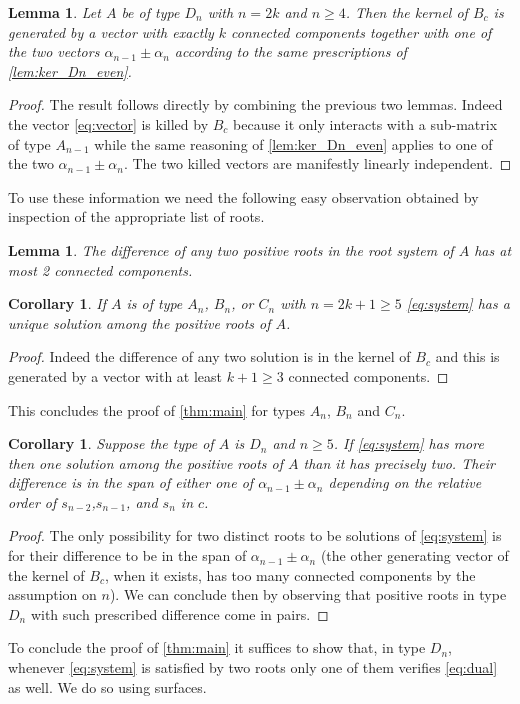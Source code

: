 \documentclass[11pt]{amsart}
\newtheorem{corollary}[theorem]{Corollary}
\newtheorem{lemma}[theorem]{Lemma}
\numberwithin{equation}{section}
\begin{document}
  \begin{lemma}
    Let $A$ be of type $D_n$ with $n=2k$ and $n\geq 4$.
    Then the kernel of $B_c$ is generated by a vector with exactly $k$ connected components together with one of the two vectors $\alpha_{n-1}\pm\alpha_n$ according to the same prescriptions of \cref{lem:ker_Dn_even}.
  \end{lemma}
  \begin{proof}
    The result follows directly by combining the previous two lemmas. 
    Indeed the vector \cref{eq:vector} is killed by $B_c$ because it only interacts with a sub-matrix of type $A_{n-1}$ while the same reasoning of \cref{lem:ker_Dn_even} applies to one of the two $\alpha_{n-1}\pm\alpha_n$.
    The two killed vectors are manifestly linearly independent.
  \end{proof}

  To use these information we need the following easy observation obtained by inspection of the appropriate list of roots.
  \begin{lemma}
    The difference of any two positive roots in the root system of $A$ has at most 2 connected components.
  \end{lemma}

  \begin{corollary}
    If $A$ is of type $A_n$, $B_n$, or $C_n$ with $n=2k+1\geq 5$ \cref{eq:system} has a unique solution among the positive roots of $A$.
  \end{corollary}
  \begin{proof}
    Indeed the difference of any two solution is in the kernel of $B_c$ and this is generated by a vector with at least $k+1\geq3$ connected components.
  \end{proof}
  This concludes the proof of \cref{thm:main} for types $A_n$, $B_n$ and $C_n$.

  \begin{corollary}
    Suppose the type of $A$ is $D_n$ and $n\geq 5$. 
    If \cref{eq:system} has more then one solution among the positive roots of $A$ than it has precisely two.
    Their difference is in the span of either one of $\alpha_{n-1}\pm\alpha_n$ depending on the relative order of $s_{n-2}$,$s_{n-1}$, and $s_n$ in $c$.
  \end{corollary}
  \begin{proof}
    The only possibility for two distinct roots to be solutions of \cref{eq:system} is for their difference to be in the span of $\alpha_{n-1}\pm\alpha_n$ (the other generating vector of the kernel of $B_c$, when it exists, has too many connected components by the assumption on $n$). 
    We can conclude then by observing that positive roots in type $D_n$ with such prescribed difference come in pairs.
  \end{proof}

  To conclude the proof of \cref{thm:main} it suffices to show that, in type $D_n$, whenever \cref{eq:system} is satisfied by two roots only one of them verifies \cref{eq:dual} as well.  
  We do so using surfaces.



\end{document}

